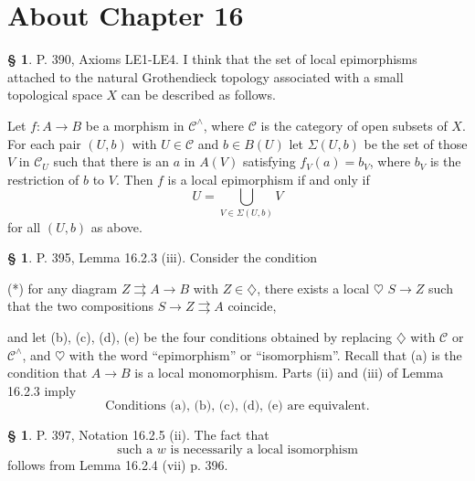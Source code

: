 \documentclass[12pt]{article}
\theoremstyle{remark}
\theoremstyle{definition}
\newtheorem{s}[thm]{\S}
\newcommand{\C}{\mathcal C}
\newcommand{\parar}{\rightrightarrows}\newcommand{\paralelarrows}{\rightrightarrows}%
\begin{document}
\section{About Chapter 16}
%
%
\begin{s} 
P. 390, Axioms LE1-LE4. I think that the set of local epimorphisms attached to the natural Grothendieck topology associated with a small topological space $X$ can be described as follows. 

Let $f:A\to B$ be a morphism in $\C^\wedge$, where $\C$ is the category of open subsets of $X$. For each pair $(U,b)$ with $U\in\C$ and $b\in B(U)$ let $\Sigma(U,b)$ be the set of those $V$ in $\C_U$ such that there is an $a$ in $A(V)$ satisfying $f_V(a)=b_V$, where $b_V$ is the restriction of $b$ to $V$. Then $f$ is a local epimorphism if and only if 
$$
U=\bigcup_{V\in\Sigma(U,b)}V
$$ 
for all $(U,b)$ as above.
\end{s}
%
%
\begin{s} 
P. 395, Lemma 16.2.3 (iii). Consider the condition 

\noindent(*) for any diagram $Z\parar A\to B$ with $Z\in\diamondsuit$, there exists a local $\heartsuit$ $S\to Z$ such that the two compositions $S\to Z\parar A$ coincide, 

\noindent and let (b), (c), (d), (e) be the four conditions obtained by replacing $\diamondsuit$ with $\C$ or $\C^\wedge$, and $\heartsuit$ with the word ``epimorphism'' or ``isomorphism''. Recall that (a) is the condition that $A\to B$ is a local monomorphism. Parts (ii) and (iii) of Lemma 16.2.3 imply 
%
\begin{equation}\label{1623}
\text{Conditions (a), (b), (c), (d), (e) are equivalent.}
\end{equation}
\end{s}
%
%
\begin{s} 
P. 397, Notation 16.2.5 (ii). The fact that 
\begin{equation}\label{1625}
\text{such a $w$ is necessarily a local isomorphism}
\end{equation}
follows from Lemma 16.2.4 (vii) p. 396.
\end{s}
%
%
\end{document}
